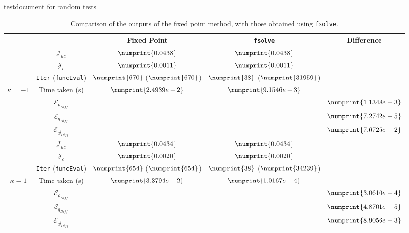 \documentclass[11pt, a4paper]{article}
\theoremstyle{definition}
\newcommand{\adj}{q}
\begin{document}
testdocument for random tests
\begin{table}
	\begin{tabular}{ | c | c || c | c | c ||}
		\hline
		\multicolumn{2}{|c||}{} & Fixed Point & \texttt{fsolve} & Difference   \\
		\hline
		\hline
		& $\mathcal{J}_{uc}$ & $\numprint{0.0438}$ & $\numprint{0.0438}$ &   \\
		& $\mathcal{J}_{c}$ & $\numprint{0.0011}$ & $\numprint{0.0011}$ &   \\
		& \texttt{Iter} (\texttt{funcEval}) & $\numprint{670}$ ($\numprint{670}$)  & $\numprint{38}$ ($\numprint{31959}$)  &   \\
		$\kappa =-1$ & Time taken (s) & $\numprint{2.4939e+2}$ & $\numprint{9.1546e+3}$ &   \\
		& $\mathcal{E}_{\rho_{Diff}}$ & & &$\numprint{1.1348e-3}$  \\
		& $\mathcal{E}_{\adj_{Diff}}$ & & &$\numprint{7.2742e-5}$  \\
		& $\mathcal{E}_{\vec{w}_{Diff}}$ & & & $\numprint{7.6725e-2}$  \\
		\hline
		& $\mathcal{J}_{uc}$ & $\numprint{0.0434}$ & $\numprint{0.0434}$ &   \\
		& $\mathcal{J}_{c}$ & $\numprint{0.0020}$ & $\numprint{0.0020}$ &   \\
		& \texttt{Iter} (\texttt{funcEval}) & $\numprint{654}$ ($\numprint{654}$)  & $\numprint{38}$ ($\numprint{34239}$)  &   \\
		$\kappa =1$ & Time taken (s) & $\numprint{3.3794e+2}$ & $\numprint{1.0167e+4}$ &   \\
		& $\mathcal{E}_{\rho_{Diff}}$ & & &$\numprint{3.0610e-4}$  \\
		& $\mathcal{E}_{\adj_{Diff}}$ & & &$\numprint{4.8701e-5}$  \\
		& $\mathcal{E}_{\vec{w}_{Diff}}$ & & & $\numprint{8.9056e-3}$  \\
		\hline
	\end{tabular}
	\caption{Comparison of the outputs of the fixed point method, with those obtained using \texttt{fsolve}.}
	\label{TabA3:Prob1}
\end{table}
\end{document}

